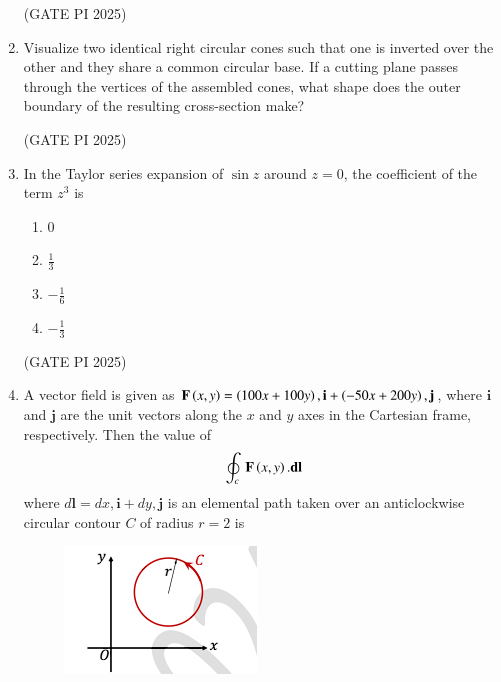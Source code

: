 \documentclass[journal,12pt,onecolumn]{IEEEtran}
\theoremstyle{remark}
\begin{document}
\begin{enumerate}
\hfill (GATE PI 2025)

\item Visualize two identical right circular cones such that one is inverted over the other and they share a common circular base. If a cutting plane passes through the vertices of the assembled cones, what shape does the outer boundary of the resulting cross-section make?

\begin{enumerate}
\end{enumerate}

\hfill (GATE PI 2025)

\item In the Taylor series expansion of $\sin z$ around $z = 0$, the coefficient of the term $z^3$ is

\begin{multicols}{4}
\begin{enumerate}
    \item 0
    \item $\frac{1}{3}$
    \item $-\frac{1}{6}$
    \item $-\frac{1}{3}$
\end{enumerate}
\end{multicols}

\hfill (GATE PI 2025)

\item A vector field is given as $\mathbf{F}\left(x,y\right) = \left(100x + 100y\right),\mathbf{i} + \left(-50x + 200y\right),\mathbf{j}$, where $\mathbf{i}$ and $\mathbf{j}$ are the unit vectors along the $x$ and $y$ axes in the Cartesian frame, respectively. Then the value of
\begin{align*}
\oint_c\ \textbf{F}\left(x,y\right).\textbf{dl}
\end{align*}
where $d\mathbf{l} = dx,\mathbf{i} + dy,\mathbf{j}$ is an elemental path taken over an anticlockwise circular contour $C$ of radius $r = 2$ is

\begin{figure}[H]
\centering
\includegraphics[width=0.5\columnwidth]{fig4.png}
\caption{}
\end{figure}


\end{enumerate}
\end{document}
